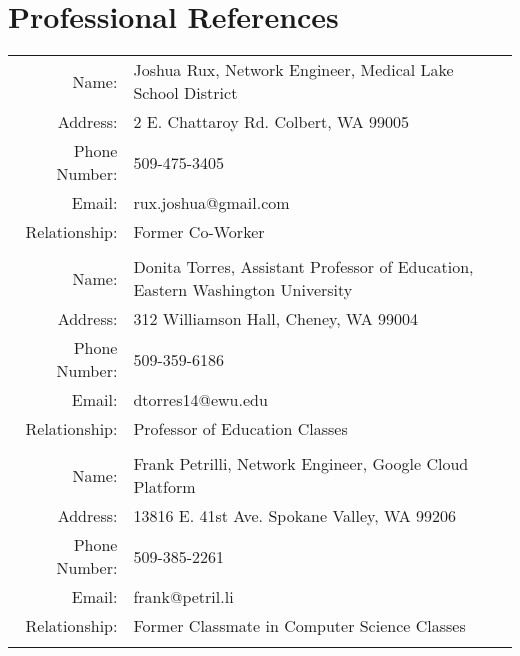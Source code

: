\documentclass[a4paper,10pt]{article}
\begin{document}
\newpage

\section{Professional References}

\begin{tabular}{r|p{14cm}}
	Name: & Joshua Rux, Network Engineer, Medical Lake School District\\
	Address: & 2 E. Chattaroy Rd. Colbert, WA 99005\\
	Phone Number: & 509-475-3405 \\
	Email: & rux.joshua@gmail.com\\
	Relationship: & Former Co-Worker\\
	\multicolumn{2}{c}{}\\

	Name: & Donita Torres, Assistant Professor of Education, Eastern Washington University \\
	Address: & 312 Williamson Hall, Cheney, WA 99004\\
	Phone Number: & 509-359-6186\\
	Email: & dtorres14@ewu.edu\\
	Relationship: & Professor of Education Classes\\
	\multicolumn{2}{c}{}\\

	Name: & Frank Petrilli, Network Engineer, Google Cloud Platform \\
	Address: & 13816 E. 41st Ave. Spokane Valley, WA 99206\\
	Phone Number: & 509-385-2261\\
	Email: & frank@petril.li\\
	Relationship: & Former Classmate in Computer Science Classes\\
	\multicolumn{2}{c}{}\\
\end{tabular}
\end{document}
